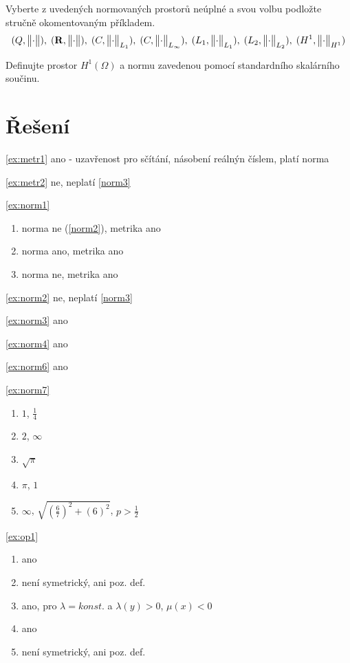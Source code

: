 \documentclass[a4paper,10pt]{book}
\def\Real{{\rm\bf R}}
\def\norm#1{\bigl\Vert#1\bigr\Vert} %
\begin{document}
\exercise \label{ex:sp1} Vyberte z uvedených normovaných prostorů neúplné a svou volbu podložte stručně okomentovaným příkladem. 
\[(Q,\norm{\cdot}),\; (\Real,\norm{\cdot}),\; (C,\norm{\cdot}_{L_1}),\;
      (C,\norm{\cdot}_{L_\infty}),\; (L_1,\norm{\cdot}_{L_1}),\; (L_2,\norm{\cdot}_{L_2}),\; (H^1,\norm{\cdot}_{H^1})\]

      
\exercise \label{ex:sp2} Definujte prostor $H^1(\Omega)$ a normu zavedenou pomocí standardního skalárního součinu.


\section{Řešení}

\ref{ex:metr1} ano - uzavřenost pro sčítání, násobení reálnýn číslem, platí norma

\ref{ex:metr2} ne, neplatí \ref{norm3}

\ref{ex:norm1}
\begin{enumerate}[label={\alph*)},itemsep=-5pt, topsep=-7pt]
\item norma ne (\ref{norm2}), metrika ano
\item norma ano, metrika ano
\item norma ne, metrika ano
\end{enumerate}

\ref{ex:norm2} ne, neplatí \ref{norm3}

\ref{ex:norm3} ano

\ref{ex:norm4} ano

\ref{ex:norm6} ano

\ref{ex:norm7}
\begin{enumerate}[label=\alph*), itemsep=-3pt, topsep=-7pt]
  \item $1$, $\frac14$
  \item $2$, $\infty$
  \item $\sqrt{\pi}$
  \item $\pi$, $1$
  \item $\infty$, $\sqrt{(\frac67)^2+(6)^2}$, $p>\frac12$
\end{enumerate}

\ref{ex:op1}
\begin{enumerate}[label=\alph*), itemsep=-3pt, topsep=-7pt]
  \item ano
  \item není symetrický, ani poz. def.
  \item ano, pro $\lambda=konst.$ a $\lambda(y)>0$, $\mu(x) <0$
  \item ano
  \item není symetrický, ani poz. def.
\end{enumerate}
\end{document}
